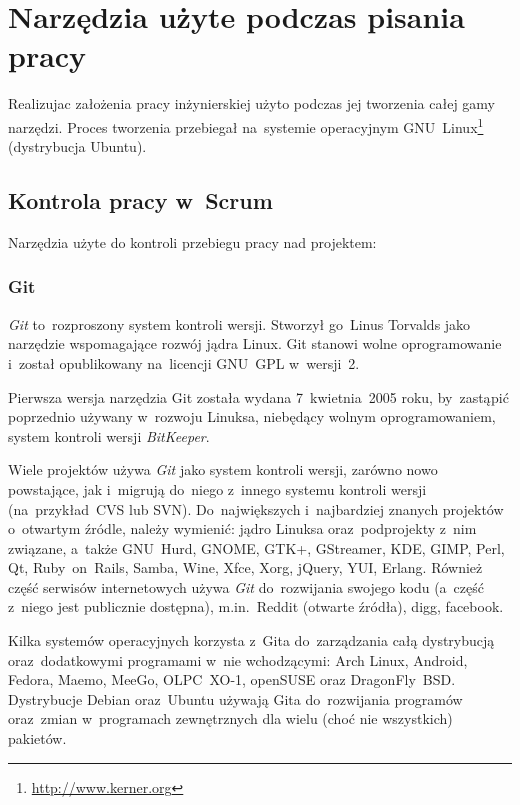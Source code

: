 \section{Narzędzia użyte podczas pisania pracy} \label{narzedzia}

Realizujac założenia pracy inżynierskiej użyto podczas jej tworzenia całej gamy narzędzi. Proces tworzenia przebiegał na~systemie operacyjnym GNU~Linux\footnote{\url{http://www.kerner.org}} (dystrybucja Ubuntu\cite{ubuntu}).

\subsection{Kontrola pracy w~Scrum}

Narzędzia użyte do kontroli przebiegu pracy nad projektem:

\subsubsection{Git}

\textit{Git}\cite{git} to~rozproszony system kontroli wersji. Stworzył go~Linus Torvalds jako narzędzie wspomagające rozwój jądra Linux. Git stanowi wolne oprogramowanie i~został opublikowany na~licencji GNU~GPL w~wersji~2.


Pierwsza wersja narzędzia Git została wydana 7~kwietnia~2005 roku, by~zastąpić poprzednio używany w~rozwoju Linuksa, niebędący wolnym oprogramowaniem, system kontroli wersji \textit{BitKeeper}.


Wiele projektów używa \textit{Git} jako system kontroli wersji, zarówno nowo powstające, jak i~migrują do~niego z~innego systemu kontroli wersji (na~przykład~CVS lub SVN). Do~największych i~najbardziej znanych projektów o~otwartym źródle, należy wymienić: jądro Linuksa oraz~podprojekty z~nim związane, a~także GNU~Hurd, GNOME, GTK+, GStreamer, KDE, GIMP, Perl, Qt, Ruby~on~Rails, Samba, Wine, Xfce, Xorg, jQuery, YUI, Erlang. Również część serwisów internetowych używa \textit{Git} do~rozwijania swojego kodu (a~część z~niego jest publicznie dostępna), m.in.~Reddit (otwarte źródła), digg, facebook.


Kilka systemów operacyjnych korzysta z~Gita do~zarządzania całą dystrybucją oraz~dodatkowymi programami w~nie wchodzącymi: Arch Linux, Android, Fedora, Maemo, MeeGo, OLPC~XO-1, openSUSE oraz DragonFly~BSD. Dystrybucje Debian oraz~Ubuntu używają Gita do~rozwijania programów oraz~zmian w~programach zewnętrznych dla wielu (choć nie wszystkich) pakietów.


